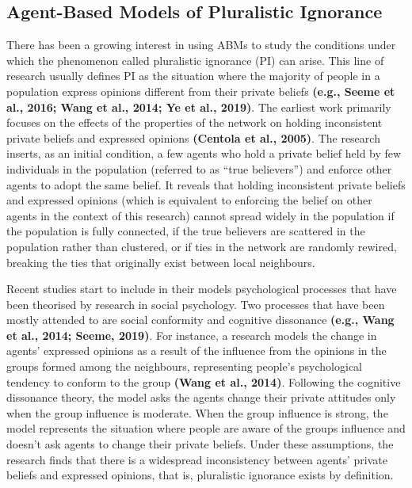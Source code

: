 \documentclass[
  11pt,
]{article}
\begin{document}
\hypertarget{agent-based-models-of-pluralistic-ignorance}{%
\subsection{Agent-Based Models of Pluralistic
Ignorance}\label{agent-based-models-of-pluralistic-ignorance}}

There has been a growing interest in using ABMs to study the conditions
under which the phenomenon called pluralistic ignorance (PI) can arise.
This line of research usually defines PI as the situation where the
majority of people in a population express opinions different from their
private beliefs \textbf{(e.g., Seeme et al., 2016; Wang et al., 2014; Ye
et al., 2019)}. The earliest work primarily focuses on the effects of
the properties of the network on holding inconsistent private beliefs
and expressed opinions \textbf{(Centola et al., 2005)}. The research
inserts, as an initial condition, a few agents who hold a private belief
held by few individuals in the population (referred to as ``true
believers'') and enforce other agents to adopt the same belief. It
reveals that holding inconsistent private beliefs and expressed opinions
(which is equivalent to enforcing the belief on other agents in the
context of this research) cannot spread widely in the population if the
population is fully connected, if the true believers are scattered in
the population rather than clustered, or if ties in the network are
randomly rewired, breaking the ties that originally exist between local
neighbours.

Recent studies start to include in their models psychological processes
that have been theorised by research in social psychology. Two processes
that have been mostly attended to are social conformity and cognitive
dissonance \textbf{(e.g., Wang et al., 2014; Seeme, 2019)}. For
instance, a research models the change in agents' expressed opinions as
a result of the influence from the opinions in the groups formed among
the neighbours, representing people's psychological tendency to conform
to the group \textbf{(Wang et al., 2014)}. Following the cognitive
dissonance theory, the model asks the agents change their private
attitudes only when the group influence is moderate. When the group
influence is strong, the model represents the situation where people are
aware of the groups influence and doesn't ask agents to change their
private beliefs. Under these assumptions, the research finds that there
is a widespread inconsistency between agents' private beliefs and
expressed opinions, that is, pluralistic ignorance exists by definition.
\end{document}
